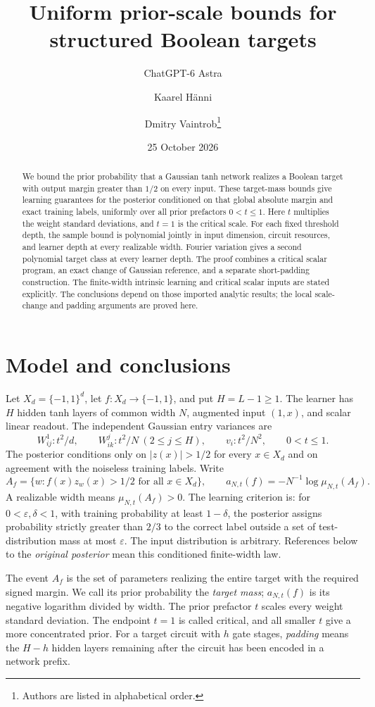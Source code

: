 \documentclass[11pt]{article}
\title{Uniform prior-scale bounds for structured Boolean targets}
\author{ChatGPT-6 Astra \and Kaarel H\"anni \and Dmitry Vaintrob\thanks{Authors are listed in alphabetical order.}}
\date{25 October 2026}
\theoremstyle{remark}\newtheorem{remark}[theorem]{Remark}
\begin{document}
\maketitle
\begin{abstract}
We bound the prior probability that a Gaussian tanh network realizes a
Boolean target with output margin greater than $1/2$ on every input.
These target-mass bounds give learning guarantees for the posterior
conditioned on that global absolute margin and exact training labels,
uniformly over all prior prefactors $0<t\le1$. Here $t$ multiplies the
weight standard deviations, and $t=1$ is the critical scale. For each fixed
threshold depth, the sample bound is polynomial jointly in input
dimension, circuit resources, and learner depth at every realizable
width. Fourier variation gives a second polynomial target class at
every learner depth. The proof combines a critical scalar program,
an exact change of Gaussian reference, and a separate short-padding
construction. The finite-width intrinsic learning and critical scalar
inputs are stated explicitly. The conclusions depend on those imported
analytic results; the local scale-change and padding arguments are
proved here.
\end{abstract}

\section{Model and conclusions}
Let $X_d=\{-1,1\}^d$, let $f:X_d\to\{-1,1\}$, and put $H=L-1\ge1$.
The learner has $H$ hidden tanh layers of common width $N$, augmented
input $(1,x)$, and scalar linear readout. The independent Gaussian
entry variances are
\[
 W^1_{ij}:t^2/d,\qquad W^j_{ik}:t^2/N\ (2\le j\le H),
 \qquad v_i:t^2/N^2,\qquad 0<t\le1.
\]
The posterior conditions only on $|z(x)|>1/2$ for every $x\in X_d$
and on agreement with the noiseless training labels. Write
\[
 A_f=\{w:f(x)z_w(x)>1/2\text{ for all }x\in X_d\},\qquad
 a_{N,t}(f)=-N^{-1}\log\mu_{N,t}(A_f).
\]
A realizable width means $\mu_{N,t}(A_f)>0$. The learning criterion is:
for $0<\varepsilon,\delta<1$, with training probability at least $1-\delta$, the posterior assigns
probability strictly greater than $2/3$ to the correct label outside a
set of test-distribution mass at most $\varepsilon$. The input
distribution is arbitrary. References below to the \emph{original
posterior} mean this conditioned finite-width law.

The event $A_f$ is the set of parameters realizing the entire target
with the required signed margin. We call its prior probability the
\emph{target mass}; $a_{N,t}(f)$ is its negative logarithm divided by
width. The prior prefactor $t$ scales every weight standard deviation.
The endpoint $t=1$ is called critical, and all smaller $t$ give a more
concentrated prior. For a target circuit with $h$ gate stages,
\emph{padding} means the $H-h$ hidden layers remaining after the circuit
has been encoded in a network prefix.
\end{document}
